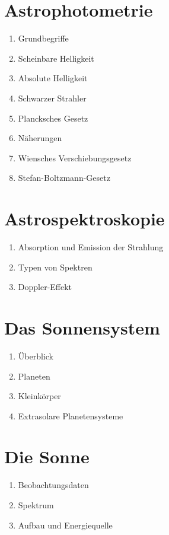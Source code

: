 \documentclass[a4paper,9pt]{article}
\begin{document}
\begin{multicols}{3}
    \section{Astrophotometrie} %
    \label{sec:astrophotometrie}
      \begin{enumerate}
        \item Grundbegriffe
        \item Scheinbare Helligkeit
        \item Absolute Helligkeit
        \item Schwarzer Strahler
        \item Plancksches Gesetz
        \item Näherungen
        \item Wiensches Verschiebungsgesetz
        \item Stefan-Boltzmann-Gesetz
      \end{enumerate}

    \section{Astrospektroskopie} %
    \label{sec:astrospektroskopie}
      \begin{enumerate}
        \item Absorption und Emission der Strahlung
        \item Typen von Spektren
        \item Doppler-Effekt
      \end{enumerate}

    \section{Das Sonnensystem} %
    \label{sec:das_sonnensystem}
      \begin{enumerate}
        \item Überblick
        \item Planeten
        \item Kleinkörper
        \item Extrasolare Planetensysteme
      \end{enumerate}

    \section{Die Sonne} %
    \label{sec:die_sonne}
      \begin{enumerate}
        \item Beobachtungsdaten
        \item Spektrum
        \item Aufbau und Energiequelle
      \end{enumerate}


\end{multicols}
\end{document}
